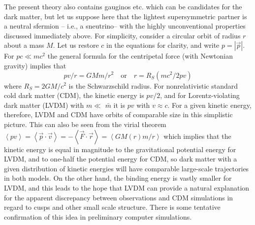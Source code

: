 \documentclass{ws-procs9x6}
\begin{document}
The present theory also contains gauginos etc. which can be candidates for
the dark matter, but let us suppose here that the lightest
supersymmetric partner is a neutral sfermion -- i.e., a sneutrino-- with the
highly unconventional properties discussed immediately above. For simplicity,
consider a circular orbit of radius $r$ about a mass $M$. Let us restore $c$
in the equations for clarity, and write $p=\left| \vec{p}\right| $. For
$pc\ll mc^{2}$ the general formula for the centripetal force (with 
Newtonian gravity) implies that
\begin{equation}
pv/r=GMm/r^{2} \quad \mbox{or} \quad
r=R_{S}\left( mc^{2}/2pv\right)
\end{equation}
where $R_{S}=2GM/c^{2}$ is the Schwarzschild radius. For nonrelativistic
standard cold dark matter (CDM), the kinetic energy is $pv/2$, and for
Lorentz-violating dark matter (LVDM) with $m\ll $ $\bar{m}$ it is $pv$ with
$v\approx c$.\cite{mondragon-allen-2001} For a given kinetic energy,
therefore, LVDM and CDM have orbits of comparable size in this simplistic
picture. This can also be seen from the virial theorem\cite
{mondragon-allen-2001}
$\left\langle pv\right\rangle =\left\langle \vec{p}\cdot \vec{v}\right\rangle
=-\left\langle \vec{F}\cdot \vec{r}\right\rangle =\left\langle GM\left(
r\right) m/r\right\rangle$
which implies that the kinetic energy is equal in magnitude to the
gravitational potential energy for LVDM, and to one-half the potential
energy for CDM, so dark matter with a given distribution of kinetic energies
will have comparable large-scale trajectories in both models. On the other
hand, the binding energy is vastly smaller for LVDM, and this leads to the
hope that LVDM can provide a natural explanation for the apparent
discrepancy between observations and CDM simulations in regard to cusps and
other small scale structure. There is some tentative confirmation of this
idea in preliminary computer simulations\cite{mondragon-allen-2001}.
\end{document}
